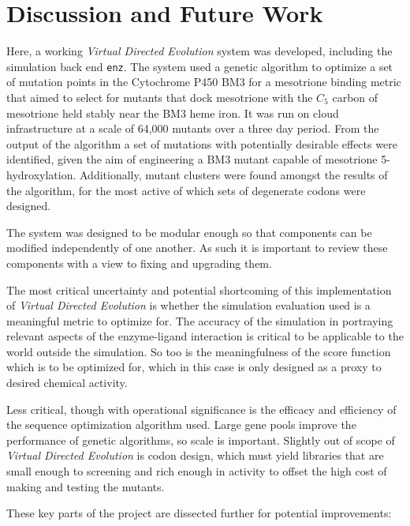 \documentclass[16pt]{article}
\begin{document}
\section{Discussion and Future Work}

Here, a working \textit{Virtual Directed Evolution} system was developed, including the simulation back end \texttt{enz}.
The system used a genetic algorithm to optimize a set of mutation points in the Cytochrome P450 BM3 for a mesotrione binding metric that aimed to select for mutants that dock mesotrione with the $C_5$ carbon of mesotrione held stably near the BM3 heme iron.
It was run on cloud infrastructure at a scale of 64,000 mutants over a three day period.
From the output of the algorithm a set of mutations with potentially desirable effects were identified, given the aim of engineering a BM3 mutant capable of mesotrione 5-hydroxylation.
Additionally, mutant clusters were found amongst the results of the algorithm, for the most active of which sets of degenerate codons were designed.

The system was designed to be modular enough so that components can be modified independently of one another.
As such it is important to review these components with a view to fixing and upgrading them.

The most critical uncertainty and potential shortcoming of this implementation of \textit{Virtual Directed Evolution} is whether the simulation evaluation used is a meaningful metric to optimize for.
The accuracy of the simulation in portraying relevant aspects of the enzyme-ligand interaction is critical to be applicable to the world outside the simulation.
So too is the meaningfulness of the score function which is to be optimized for, which in this case is only designed as a proxy to desired chemical activity.

Less critical, though with operational significance is the efficacy and efficiency of the sequence optimization algorithm used.
Large gene pools improve the performance of genetic algorithms, so scale is important.
Slightly out of scope of \textit{Virtual Directed Evolution} is codon design, which must yield libraries that are small enough to screening and rich enough in activity to offset the high cost of making and testing the mutants.

These key parts of the project are dissected further for potential improvements:
\end{document}
